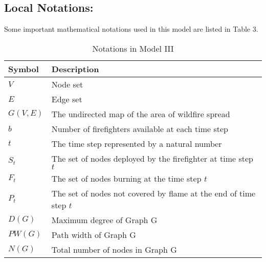 \documentclass[12pt]{article}  %
\begin{document}
\subsection{Local Notations:}
Some important mathematical notations used in this model are listed in Table 3. 
\begin{table}[h]
	\begin{center}
		\caption{Notations in Model III}
		\begin{tabular}{m{2cm} m{12cm}}
			\toprule[2pt]
			\multicolumn{1}{m{3cm}}{\centering Symbol}
			&\multicolumn{1}{m{12cm}}{\centering Description }\\
			\midrule
			$V$& Node set \\
			\vspace{2pt}
			$E$& Edge set \\
			\vspace{2pt}
			$G(V,E)$& The undirected map of the area of wildfire spread \\
			\vspace{2pt}
			$b$& Number of firefighters available at each time step \\
			\vspace{2pt}
			$t$& The time step represented by a natural number \\
			\vspace{2pt}
			$S_t$& The set of nodes deployed by the firefighter at time step $t$ \\
			\vspace{2pt}
			$F_t$& The set of nodes burning at the time step $t$ \\
			\vspace{2pt}
			$P_t$& The set of nodes not covered by flame at the end of time step $t$ \\
			\vspace{2pt}
			$D(G)$& Maximum degree of Graph G \\
			\vspace{2pt}
			$PW(G)$& Path width of Graph G\\
			\vspace{2pt}
			$N(G)$& Total number of nodes in Graph G \\
			
			\bottomrule[2pt]
		\end{tabular}
	\end{center}
\end{table}
\vspace{-0.4cm}%
\end{document}
